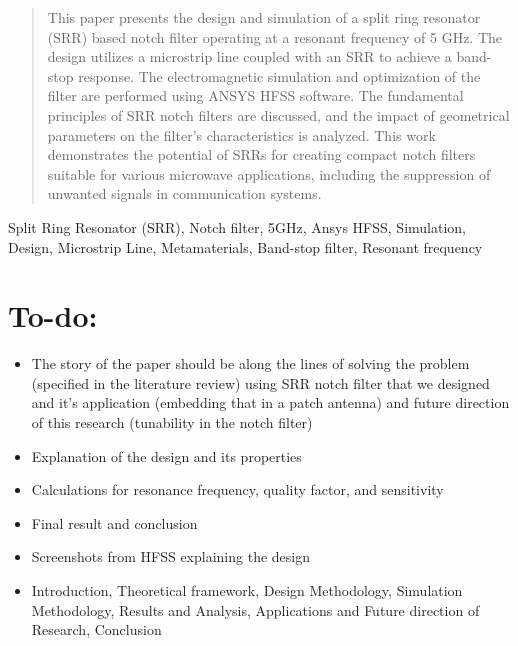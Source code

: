\documentclass[conference]{IEEEtran}
\begin{document}
\maketitle

\begin{abstract}
This paper presents the design and simulation of a split ring resonator (SRR) based notch filter operating at a resonant frequency of 5 GHz. The design utilizes a microstrip line coupled with an SRR to achieve a band-stop response. The electromagnetic simulation and optimization of the filter are performed using ANSYS HFSS software. The fundamental principles of SRR notch filters are discussed, and the impact of geometrical parameters on the filter's characteristics is analyzed. This work demonstrates the potential of SRRs for creating compact notch filters suitable for various microwave applications, including the suppression of unwanted signals in communication systems.
\end{abstract}

\begin{IEEEkeywords}
Split Ring Resonator (SRR), Notch filter, 5GHz, Ansys HFSS, Simulation, Design, Microstrip Line, Metamaterials, Band-stop filter, Resonant frequency
\end{IEEEkeywords}

\section{To-do:}
\begin{itemize}
    \item The story of the paper should be along the lines of solving the problem (specified in the literature review) using SRR notch filter that we designed and it's application (embedding that in a patch antenna) and future direction of this research (tunability in the notch filter)
    \item Explanation of the design and its properties
    \item Calculations for resonance frequency, quality factor, and sensitivity
    \item Final result and conclusion
    \item Screenshots from HFSS explaining the design
    \item Introduction, Theoretical framework, Design Methodology, Simulation Methodology, Results and Analysis, Applications and Future direction of Research, Conclusion
\end{itemize}
\end{document}
